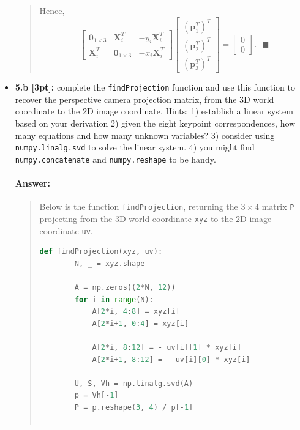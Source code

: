 \documentclass[11pt]{article}
\begin{document}
\begin{itemize}
\begin{quote}
    Hence, 
    \begin{equation*}
    \begin{bmatrix}
        \mathbf{0}_{1\times3} & \mathbf{X}_i^T & -y_i \mathbf{X}_i^T \\
        \mathbf{X}_i^T & \mathbf{0}_{1\times3} & -x_i \mathbf{X}_i^T 
    \end{bmatrix}
    \begin{bmatrix}
        (\mathbf{p}_1^T)^T \\ (\mathbf{p}_2^T)^T \\ (\mathbf{p}_3^T)^T
    \end{bmatrix}
    =
    \begin{bmatrix}
        0 \\ 0
    \end{bmatrix}. ~~~ \blacksquare
    \end{equation*}
        
\end{quote}

\item \textbf{5.b [3pt]:} complete the \texttt{findProjection} function and use this function to recover the perspective camera projection matrix, from the 3D world coordinate to the 2D image coordinate. Hints: 1) establish a linear system based on your derivation 2) given the eight keypoint correspondences, how many equations and how many unknown variables? 3) consider using \texttt{numpy.linalg.svd} to solve the linear system. 4) you might find \texttt{numpy.concatenate} and \texttt{numpy.reshape} to be handy.  

\paragraph{Answer:} 
\begin{quote}
    Below is the function \texttt{findProjection}, returning the $3 \times 4$ matrix \verb|P| projecting from the 3D world coordinate \verb|xyz| to the 2D image coordinate \verb|uv|.
    \begin{lstlisting}[language=Python]
    def findProjection(xyz, uv):
        N, _ = xyz.shape
        
        A = np.zeros((2*N, 12))
        for i in range(N):
            A[2*i, 4:8] = xyz[i]
            A[2*i+1, 0:4] = xyz[i]
            
            A[2*i, 8:12] = - uv[i][1] * xyz[i]
            A[2*i+1, 8:12] = - uv[i][0] * xyz[i]
        
        U, S, Vh = np.linalg.svd(A)
        p = Vh[-1]
        P = p.reshape(3, 4) / p[-1]
        

\end{lstlisting}
\end{quote}
\end{itemize}
\end{document}

